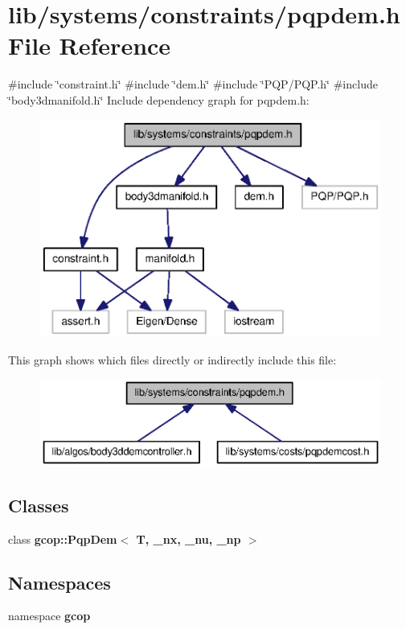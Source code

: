 \section{lib/systems/constraints/pqpdem.h \-File \-Reference}
\label{pqpdem_8h}
{\ttfamily \#include \char`\"{}constraint.\-h\char`\"{}}\*
{\ttfamily \#include \char`\"{}dem.\-h\char`\"{}}\*
{\ttfamily \#include \char`\"{}\-P\-Q\-P/\-P\-Q\-P.\-h\char`\"{}}\*
{\ttfamily \#include \char`\"{}body3dmanifold.\-h\char`\"{}}\*
\-Include dependency graph for pqpdem.\-h\-:
\nopagebreak
\begin{figure}[H]
\begin{center}
\leavevmode
\includegraphics[width=350pt]{pqpdem_8h__incl}
\end{center}
\end{figure}
\-This graph shows which files directly or indirectly include this file\-:
\nopagebreak
\begin{figure}[H]
\begin{center}
\leavevmode
\includegraphics[width=350pt]{pqpdem_8h__dep__incl}
\end{center}
\end{figure}
\subsection*{\-Classes}
\begin{DoxyCompactItemize}
\item 
class {\bf gcop\-::\-Pqp\-Dem$<$ T, \-\_\-nx, \-\_\-nu, \-\_\-np $>$}
\end{DoxyCompactItemize}
\subsection*{\-Namespaces}
\begin{DoxyCompactItemize}
\item 
namespace {\bf gcop}
\end{DoxyCompactItemize}
